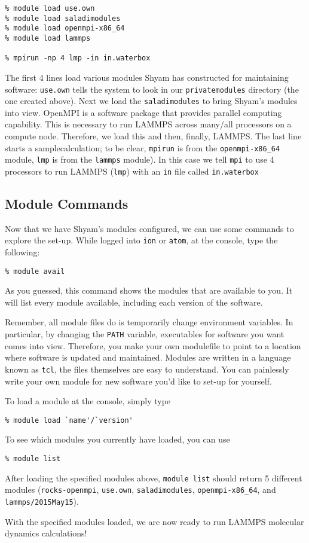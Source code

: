 \documentclass{article}
\begin{document}
\begin{lstlisting}
% module load use.own
% module load saladimodules
% module load openmpi-x86_64
% module load lammps

% mpirun -np 4 lmp -in in.waterbox
\end{lstlisting}

The first 4 lines load various modules Shyam has constructed for maintaining software:
\texttt{use.own} tells the system to look in our \texttt{privatemodules} directory (the one created above).
Next we load the \texttt{saladimodules} to bring Shyam's modules into view.
OpenMPI is a software package that provides parallel computing capability. This is necessary to run LAMMPS across many/all processors on a compute node. Therefore, we load this and then, finally, LAMMPS. The last line starts a samplecalculation; to be clear, \texttt{mpirun} is from the \texttt{openmpi-x86\_64} module, \texttt{lmp} is from the \texttt{lammps} module).
In this case we tell \texttt{mpi} to use 4 processors to run LAMMPS (\texttt{lmp}) with an \texttt{in} file called \texttt{in.waterbox}

\subsection*{Module Commands}
Now that we have Shyam's modules configured, we can use some commands to explore the set-up.
While logged into \texttt{ion} or \texttt{atom}, at the console, type the following:

\begin{lstlisting}
% module avail
\end{lstlisting}

As you guessed, this command shows the modules that are available to you.
It will list every module available, including each version of the software.

Remember, all module files do is temporarily change environment variables.
In particular, by changing the \texttt{PATH} variable, executables for software you want comes into view.
Therefore, you make your own modulefile to point to a location where software is updated and maintained.
Modules are written in a language known as \texttt{tcl}, the files themselves are easy to understand.
You can painlessly write your own module for new software you'd like to set-up for yourself.

To load a module at the console, simply type

\begin{lstlisting}
% module load `name'/`version'
\end{lstlisting}

To see which modules you currently have loaded, you can use

\begin{lstlisting}
% module list
\end{lstlisting}

After loading the specified modules above, \texttt{module list} should return 5 different modules (\texttt{rocks-openmpi}, \texttt{use.own}, \texttt{saladimodules}, \texttt{openmpi-x86\_64}, and \texttt{lammps/2015May15}).

With the specified modules loaded, we are now ready to run LAMMPS molecular dynamics calculations!
\end{document}
